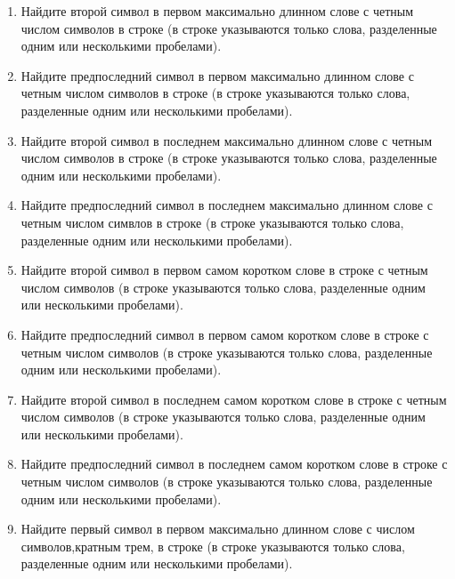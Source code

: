 \begin{enumerate}
\item Найдите второй символ в первом максимально длинном слове с четным числом символов в строке (в строке указываются только слова, разделенные одним или несколькими пробелами). 
\item Найдите предпоследний символ в первом максимально длинном слове с четным числом символов в строке (в строке указываются только слова, разделенные одним или несколькими пробелами). 
\item Найдите второй символ в последнем максимально длинном слове с четным числом символов в строке (в строке указываются только слова, разделенные одним или несколькими пробелами). 
\item Найдите предпоследний символ в последнем максимально длинном слове с четным числом симвлов в строке (в строке указываются только слова, разделенные одним или несколькими пробелами). 
\item Найдите второй символ в первом самом коротком слове в строке с четным числом символов (в строке указываются только слова, разделенные одним или несколькими пробелами). 
\item Найдите предпоследний символ в первом самом коротком слове в строке с четным числом символов (в строке указываются только слова, разделенные одним или несколькими пробелами). 
\item Найдите второй символ в последнем самом коротком слове в строке с четным числом символов (в строке указываются только слова, разделенные одним или несколькими пробелами). 
\item Найдите предпоследний символ в последнем самом коротком слове в строке с четным числом символов (в строке указываются только слова, разделенные одним или несколькими пробелами). 

\item Найдите первый символ в первом максимально длинном слове с числом символов,кратным трем, в строке (в строке указываются только слова, разделенные одним или несколькими пробелами). 
\end{enumerate}

